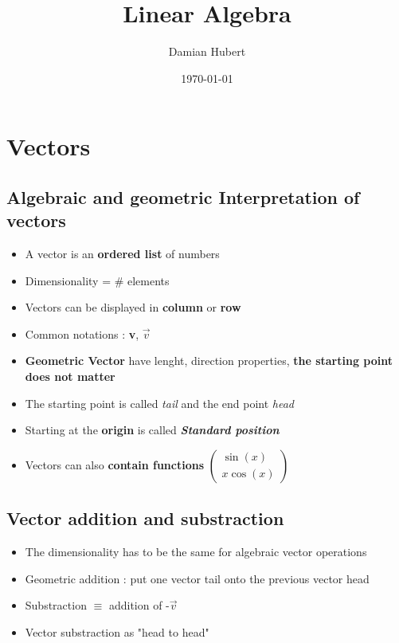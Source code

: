 \documentclass{report_template}
\author{Damian Hubert}
\title{Linear Algebra}
\date{\today}
\begin{document}
\maketitle
\tableofcontents

\chapter{Vectors}

\begin{multicols*}{2}

\section{Algebraic and geometric Interpretation of vectors}

\begin{itemize}
  \item A vector is an \textbf{ordered list} of numbers 
  \item Dimensionality = \# elements 
  \item Vectors can be displayed in \textbf{column} or \textbf{row} 
  \item Common notations : \textbf{v}, $\vec{v}$ 
  \item \textbf{Geometric Vector} have lenght, direction properties, \textbf{the starting point does not matter} 
  \item The starting point is called \textit{tail} and the end point \textit{head} 
  \item Starting at the \textbf{origin} is called \textbf{\textit{Standard position}} 
  \item Vectors can also \textbf{contain functions} $\begin{pmatrix} \sin(x)\\ x\cos(x) \end{pmatrix}$ 
\end{itemize}


\section{Vector addition and substraction}

\begin{itemize}
  \item The dimensionality has to be the same for algebraic vector operations 
  \item Geometric addition : put one vector tail onto the previous vector head 
  \item Substraction $\equiv$ addition of -$\vec{v}$ 
  \item Vector substraction as "head to head"
\end{itemize}

\end{multicols*}
\end{document}
